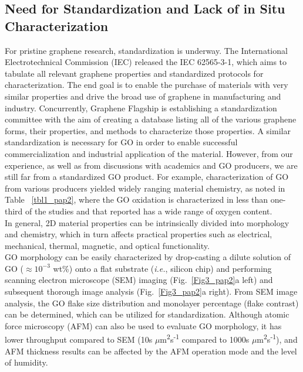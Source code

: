 \subsection{Need for Standardization and Lack of in Situ Characterization}
For pristine graphene research, standardization is underway. The International Electrotechnical Commission (IEC) released the IEC 62565-3-1,\cite{IEC} which aims to tabulate all relevant graphene properties and standardized protocols for characterization. The end goal is to enable the purchase of materials with very similar properties and drive the broad use of graphene in manufacturing and industry. Concurrently, Graphene Flagship is establishing a standardization committee with the aim of creating a database listing all of the various graphene forms, their properties, and methods to characterize those properties.\cite{Flag} A similar standardization is necessary for GO in order to enable successful commercialization and industrial application of the material. However, from our experience, as well as from discussions with academics and GO producers, we are still far from a standardized GO product. For example, characterization of GO from various producers yielded widely ranging material chemistry, as noted in Table ~\ref{tbl1_pap2}, where the GO oxidation is characterized in less than one-third of the studies and that reported has a wide range of oxygen content.\\
In general, 2D material properties can be intrinsically divided into morphology and chemistry, which in turn affects practical properties such as electrical, mechanical, thermal, magnetic, and optical functionality.\\
GO morphology can be easily characterized by drop-casting a dilute solution of GO ($\approx10^{-3}$ wt\%) onto a flat substrate (\textit{i.e.}, silicon chip) and performing scanning electron microscope (SEM) imaging (Fig.~\ref{Fig3_pap2}a left) and subsequent thorough image analysis (Fig.~\ref{Fig3_pap2}a right). From SEM image analysis, the GO flake size distribution and monolayer percentage (flake contrast) can be determined,\cite{hernandez2008high} which can be utilized for standardization. Although atomic force microscopy (AFM) can also be used to evaluate GO morphology, it has lower throughput compared to SEM (10s $\mu$m\textsuperscript{2}s\textsuperscript{-1} compared to 1000s $\mu$m\textsuperscript{2}s\textsuperscript{-1}), and AFM thickness results can be affected by the AFM operation mode and the level of humidity.\cite{santos2012effects}

